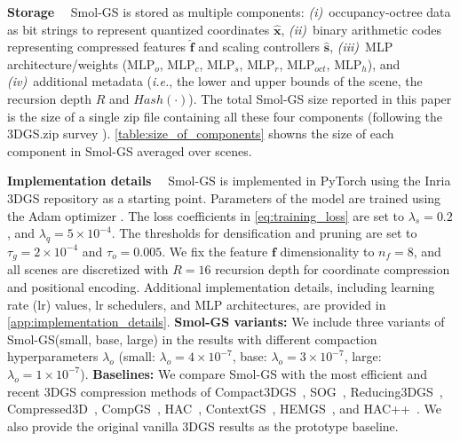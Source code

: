 \documentclass{article}
\def\vf{{\bm{f}}}
\def\vs{{\bm{s}}}
\def\vx{{\bm{x}}}
\newcommand{\ours}{Smol-GS\xspace}
\newcommand{\MLP}{\mathrm{MLP}}
\newcommand{\ie}{\textit{i.e.}\xspace}
\renewcommand{\paragraph}[1]{\noindent\textbf{#1}~~}
\begin{document}
\paragraph{Storage}
\ours is stored as multiple components: {\em (i)}~occupancy-octree data as bit strings to represent quantized coordinates $\hat{\vx}$, {\em (ii)}~binary arithmetic codes representing compressed features $\hat{\vf}$ and scaling controllers $\hat{\vs}$, {\em (iii)}~MLP architecture/weights ($\MLP_{o}$, $\MLP_{c}$, $\MLP_{s}$, $\MLP_{r}$, $\MLP_{oct}$, $\MLP_{h}$), and {\em (iv)}~additional metadata (\ie, the lower and upper bounds of the scene, the recursion depth $R$ and $Hash(\cdot)$). The total \ours size reported in this paper is the size of a single zip file containing all these four components (following the 3DGS.zip survey \cite{bagdasarian20253dgszip}). \cref{table:size_of_components} showns the size of each component in \ours averaged over scenes.




\paragraph{Implementation details} 
\ours is implemented in PyTorch \cite{paszke2019pytorch} using the Inria 3DGS repository \cite{kerbl20233dgs} as a starting point. Parameters of the model are trained using the Adam optimizer \cite{kingma2014adam}. The loss coefficients in \cref{eq:training_loss} are set to $\lambda_{s}=0.2$, and $\lambda_{q}=5\times 10^{-4}$.  The thresholds for densification and pruning are set to $\tau_{g} = 2 \times 10^{-4}$ and $\tau_{o} = 0.005$. We fix the feature $\vf$ dimensionality to $n_f=8$, and all scenes are discretized with $R=16$ recursion depth for coordinate compression and positional encoding. Additional implementation details, including learning rate (lr) values, lr schedulers, and MLP architectures, are provided in \cref{app:implementation_details}.
%
\textbf{\ours variants:} We include three variants of \ours (small, base, large) in the results with different compaction hyperparameters $\lambda_o$ (small: $\lambda_{o}=4{\times}10^{-7}$, base: $\lambda_{o}=3{\times}10^{-7}$, large: $\lambda_{o}=1{\times}10^{-7}$).
%
\textbf{Baselines:} We compare \ours with the most efficient and recent 3DGS compression methods of Compact3DGS~\cite{lee2024compact3d}, SOG~\cite{morgenstern2024sog},  Reducing3DGS~\cite{papantonakis2024reducing3d}, Compressed3D~\cite{niedermayr2024compressed3d}, CompGS~\cite{navaneet2024compgs}, HAC~\cite{chen2024hac}, ContextGS~\cite{wang2024contextgs}, HEMGS~\cite{liu2024hemgs}, and HAC++~\cite{chen2025hac++}.  We also provide the original vanilla 3DGS results as the prototype baseline.
\end{document}
